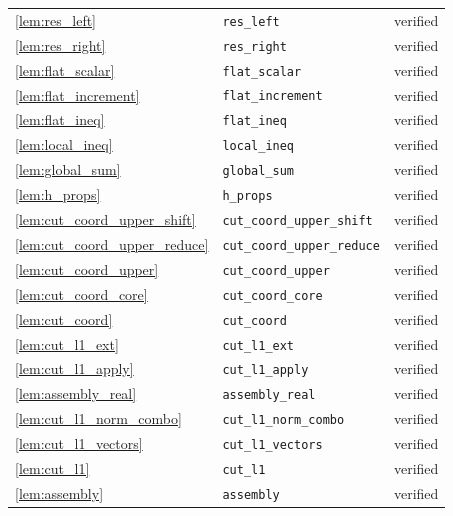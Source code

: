 \documentclass[11pt]{article}
\theoremstyle{definition}
\theoremstyle{remark}
\begin{document}
\begin{longtable}{@{}lll@{}}
\cref{lem:res_left} & \texttt{res\_left} & verified \\
\cref{lem:res_right} & \texttt{res\_right} & verified \\
\cref{lem:flat_scalar} & \texttt{flat\_scalar} & verified \\
\cref{lem:flat_increment} & \texttt{flat\_increment} & verified \\
\cref{lem:flat_ineq} & \texttt{flat\_ineq} & verified \\
\cref{lem:local_ineq} & \texttt{local\_ineq} & verified \\
\cref{lem:global_sum} & \texttt{global\_sum} & verified \\
\cref{lem:h_props} & \texttt{h\_props} & verified \\
\cref{lem:cut_coord_upper_shift} & \texttt{cut\_coord\_upper\_shift} & verified \\
\cref{lem:cut_coord_upper_reduce} & \texttt{cut\_coord\_upper\_reduce} & verified \\
\cref{lem:cut_coord_upper} & \texttt{cut\_coord\_upper} & verified \\
\cref{lem:cut_coord_core} & \texttt{cut\_coord\_core} & verified \\
\cref{lem:cut_coord} & \texttt{cut\_coord} & verified \\
\cref{lem:cut_l1_ext} & \texttt{cut\_l1\_ext} & verified \\
\cref{lem:cut_l1_apply} & \texttt{cut\_l1\_apply} & verified \\
\cref{lem:assembly_real} & \texttt{assembly\_real} & verified \\
\cref{lem:cut_l1_norm_combo} & \texttt{cut\_l1\_norm\_combo} & verified \\
\cref{lem:cut_l1_vectors} & \texttt{cut\_l1\_vectors} & verified \\
\cref{lem:cut_l1} & \texttt{cut\_l1} & verified \\
\cref{lem:assembly} & \texttt{assembly} & verified \\
\bottomrule
\end{longtable}
\end{document}
